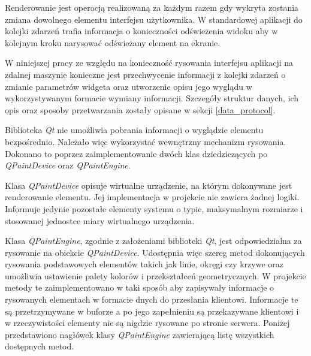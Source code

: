 Renderowanie jest operacją realizowaną za każdym razem gdy wykryta zostania zmiana dowolnego elementu interfejsu użytkownika. W standardowej aplikacji do kolejki zdarzeń trafia informacja o konieczności odświeżenia widoku aby w kolejnym kroku narysować odświeżany element na ekranie. 

W niniejszej pracy ze względu na konieczność rysowania interfejsu aplikacji na zdalnej maszynie konieczne jest przechwycenie informacji z kolejki zdarzeń o zmianie parametrów widgeta oraz utworzenie opisu jego wyglądu w wykorzystywanym formacie wymiany informacji. Szczegóły struktur danych, ich opis oraz sposoby przetwarzania zostały opisane w sekcji \ref{data_protocol}.

Biblioteka \emph{Qt} nie umożliwia pobrania informacji o wyglądzie elementu bezpośrednio. Należało więc wykorzystać wewnętrzny mechanizm rysowania. Dokonano to poprzez zaimplementowanie dwóch klas dziedziczących po \emph{QPaintDevice} oraz \emph{QPaintEngine}. 

Klasa \emph{QPaintDevice} opisuje wirtualne urządzenie, na którym dokonywane jest renderowanie elementu. Jej implementacja w projekcie nie zawiera żadnej logiki. Informuje jedynie pozostałe elementy systemu o typie, maksymalnym rozmiarze i stosowanej jednostce miary wirtualnego urządzenia. 

Klasa \emph{QPaintEngine}, zgodnie z założeniami biblioteki \emph{Qt}, jest odpowiedzialna za rysowanie na obiekcie \emph{QPaintDevice}. Udostępnia więc szereg metod dokonujących rysowania podstawowych elementów takich jak linie, okręgi czy krzywe oraz umożliwia ustawienie palety kolorów i przekształceń geometrycznych. W projekcie metody te zaimplementowano w taki sposób aby zapisywały informacje o rysowanych elementach w formacie dnych do przesłania klientowi. Informacje te są przetrzymywane w buforze a po jego zapełnieniu są przekazywane klientowi i w rzeczywistości elementy nie są nigdzie rysowane po stronie serwera. Poniżej przedstawiono nagłówek klasy \emph{QPaintEngine} zawierającą listę wszystkich dostępnych metod.

